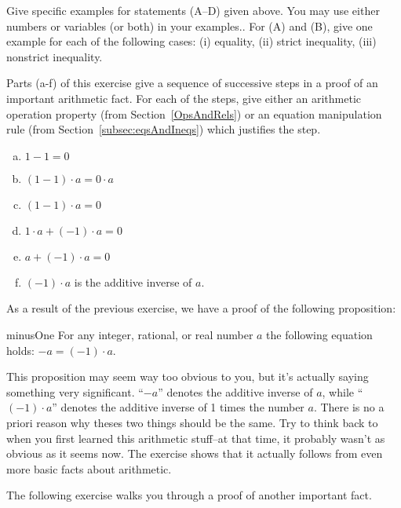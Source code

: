 \begin{exercise}{4}
Give specific examples for statements (A--D)   given above. You may use either numbers or variables (or both) in your examples.. For (A) and (B), give one example for each of the following cases: (i) equality, (ii) strict inequality, (iii) nonstrict inequality.
\end{exercise}

\begin{exercise}{}
Parts (a-f) of this exercise give a sequence of successive steps in a proof of an important arithmetic fact. For each of the steps, give either an arithmetic operation property (from Section~\ref{OpsAndRels}) or an equation manipulation rule (from Section~\ref{subsec:eqsAndIneqs}) which justifies the step.
\begin{enumerate}[(a)]
\item
$1 -1 = 0$
\item
$(1-1)\cdot a = 0 \cdot a$
\item
$(1-1)\cdot a = 0$
\item
$1 \cdot a + (-1) \cdot a = 0$
\item
$a + (-1) \cdot a = 0$
\item
$(-1) \cdot a$ is the additive inverse of $a$.
\end{enumerate}
\end{exercise}

As a result of the previous exercise, we have a proof of the following proposition:

\begin{prop}{minusOne}
For any integer, rational, or real number $a$ the following equation holds: $ -a =  (-1) \cdot a $. 
\end{prop}
This proposition may seem way too obvious to you, but it's actually saying something very significant. ``$-a$'' denotes the additive inverse of $a$, while ``$(-1) \cdot a$'' denotes the additive inverse of 1 times the number $a$. There is no a priori reason why theses two things should be the same. Try to think back to when you first learned this arithmetic stuff--at that time, it probably wasn't as obvious as it seems now. The exercise shows that it actually follows from even more basic facts about arithmetic.


The following exercise walks you through a proof of another important fact.

